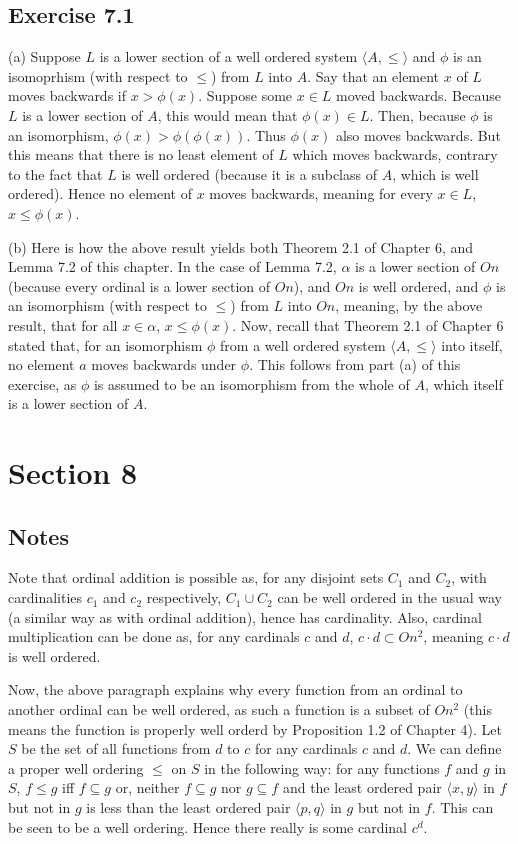 \documentclass{article}
\theoremstyle{definition}
\begin{document}
\subsection*{Exercise 7.1}
(a) Suppose $L$ is a lower section of a well ordered system $\langle A,\le\rangle$ and $\phi$ is an isomoprhism (with respect to $\le$) from 
$L$ into $A$. Say that an element $x$ of $L$ moves backwards if $x>\phi(x)$. Suppose some $x\in L$ moved backwards. Because $L$ is a lower section of 
$A$, this would mean that $\phi(x)\in L$.
Then, because $\phi$ is an isomorphism, $\phi(x)>\phi(\phi(x))$. Thus $\phi(x)$ also moves backwards. But this means that there is no least element of 
$L$ which moves backwards, contrary to the fact that $L$ is well ordered (because it is a subclass of $A$, which is well ordered). Hence no element of 
$x$ moves backwards, meaning for every $x\in L$, $x\le\phi(x)$.

(b) Here is how the above result yields both Theorem 2.1 of Chapter 6, and Lemma 7.2 of this chapter. In the case of Lemma 7.2, $\alpha$ is a lower section of 
$On$ (because every ordinal is a lower section of $On$), and $On$ is well ordered, and $\phi$ is an isomorphism (with respect to $\le$) from $L$ into $On$, meaning, 
by the above result, that for all $x\in\alpha$, $x\le\phi(x)$. Now, recall that Theorem 2.1 of Chapter 6 stated that, for an isomorphism $\phi$ from a 
well ordered system $\langle A,\le\rangle$ into itself, no element $a$ moves backwards under $\phi$. This follows from part (a) of this exercise, as 
$\phi$ is assumed to be an isomorphism from the whole of $A$, which itself is a lower section of $A$.

\section*{Section 8}

\subsection*{Notes}
Note that ordinal addition is possible as, for any disjoint sets $C_1$ and $C_2$, with cardinalities 
$c_1$ and $c_2$ respectively, $C_1\cup C_2$ can be well ordered in the usual way (a similar way as with ordinal addition), 
hence has cardinality. Also, cardinal multiplication can be done as, for any cardinals 
$c$ and $d$, $c\cdot d\subset On^2$, meaning $c\cdot d$ is well ordered.

Now, the above paragraph explains why every function from an ordinal to another ordinal can be well ordered, as such 
a function is a subset of $On^2$ (this means the function is properly well orderd by Proposition 1.2 of Chapter 4). 
Let $S$ be the set of all functions from $d$ to $c$ for any cardinals $c$ and $d$. We can define a proper well ordering $\le$ on 
$S$ in the following way: for any functions $f$ and $g$ in $S$, 
$f\le g$ iff $f\subseteq g$ or, neither $f\subseteq g$ nor $g\subseteq f$ and 
the least ordered pair $\langle x,y\rangle$ in $f$ but not in $g$ is less than the least ordered pair 
$\langle p,q\rangle$ in $g$ but not in $f$. This can be seen to be a well ordering. Hence there really is some 
cardinal $c^d$. 
\end{document}
